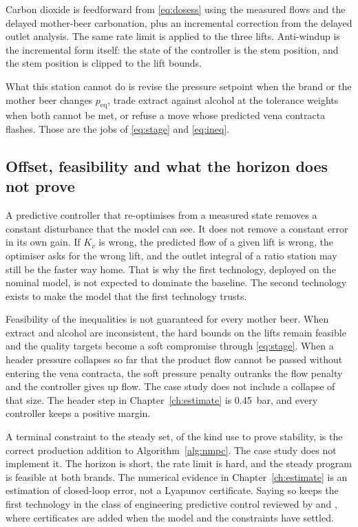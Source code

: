 Carbon dioxide is feedforward from \eqref{eq:dosess} using the measured flows and the delayed mother-beer carbonation, plus an incremental correction from the delayed outlet analysis. The same rate limit is applied to the three lifts. Anti-windup is the incremental form itself: the state of the controller is the stem position, and the stem position is clipped to the lift bounds.

What this station cannot do is revise the pressure setpoint when the brand or the mother beer changes $p_{\mathrm{eq}}$, trade extract against alcohol at the tolerance weights when both cannot be met, or refuse a move whose predicted vena contracta flashes. Those are the jobs of \eqref{eq:stage} and \eqref{eq:ineq}.

\subsection{Offset, feasibility and what the horizon does not prove}

A predictive controller that re-optimises from a measured state removes a constant disturbance that the model can see. It does not remove a constant error in its own gain. If $K_v$ is wrong, the predicted flow of a given lift is wrong, the optimiser asks for the wrong lift, and the outlet integral of a ratio station may still be the faster way home. That is why the first technology, deployed on the nominal model, is not expected to dominate the baseline. The second technology exists to make the model that the first technology trusts.

Feasibility of the inequalities is not guaranteed for every mother beer. When extract and alcohol are inconsistent, the hard bounds on the lifts remain feasible and the quality targets become a soft compromise through \eqref{eq:stage}. When a header pressure collapses so far that the product flow cannot be passed without entering the vena contracta, the soft pressure penalty outranks the flow penalty and the controller gives up flow. The case study does not include a collapse of that size. The header step in Chapter~\ref{ch:estimate} is \SI{0.45}{bar}, and every controller keeps a positive margin.

A terminal constraint to the steady set, of the kind \citet{mayne2000} use to prove stability, is the correct production addition to Algorithm~\ref{alg:nmpc}. The case study does not implement it. The horizon is short, the rate limit is hard, and the steady program is feasible at both brands. The numerical evidence in Chapter~\ref{ch:estimate} is an estimation of closed-loop error, not a Lyapunov certificate. Saying so keeps the first technology in the class of engineering predictive control reviewed by \citet{qin2003} and \citet{maciejowski2002}, where certificates are added when the model and the constraints have settled.

